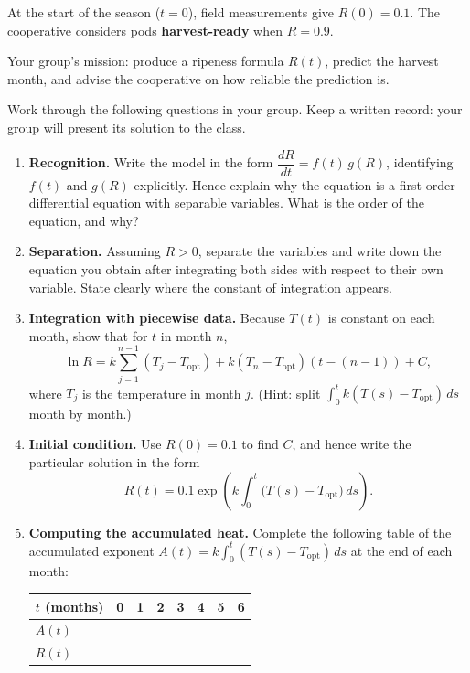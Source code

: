 \documentclass[11pt]{article}
\newcommand{\cle}[1]{{\popxbold\color{popdark}#1}}
\newcounter{popsec}
\newcounter{popsub}
\newcommand{\courssub}[1]{%
  \stepcounter{popsub}%
  \par\vspace{9pt}\noindent{\popxbold\fontsize{11.5}{13}\selectfont\color{popink}{\color{poporange}\thepopsec.\thepopsub}\hspace{6pt}#1}\par\nopagebreak\vspace{4pt}
}
\begin{document}
At the start of the season ($t=0$), field measurements give $R(0)=0.1$. The cooperative considers pods \textbf{harvest-ready} when $R=0.9$.

Your group's mission: produce a ripeness formula $R(t)$, predict the harvest month, and advise the cooperative on how reliable the prediction is.

\courssub{Tasks}

Work through the following questions in your group. Keep a written record: your group will present its solution to the class.

\begin{enumerate}
\item \textbf{Recognition.} Write the model in the form $\dfrac{dR}{dt}=f(t)\,g(R)$, identifying $f(t)$ and $g(R)$ explicitly. Hence explain why the equation is a first order differential equation with \cle{separable variables}. What is the order of the equation, and why?

\item \textbf{Separation.} Assuming $R>0$, separate the variables and write down the equation you obtain after integrating both sides with respect to their own variable. State clearly where the constant of integration appears.

\item \textbf{Integration with piecewise data.} Because $T(t)$ is constant on each month, show that for $t$ in month $n$,
\[
\ln R = k\sum_{j=1}^{n-1}(T_j-T_{\mathrm{opt}}) + k(T_n-T_{\mathrm{opt}})(t-(n-1)) + C,
\]
where $T_j$ is the temperature in month $j$. (Hint: split $\int_0^t k(T(s)-T_{\mathrm{opt}})\,ds$ month by month.)

\item \textbf{Initial condition.} Use $R(0)=0.1$ to find $C$, and hence write the particular solution in the form
\[
R(t)=0.1\exp\!\left(k\int_0^t \bigl(T(s)-T_{\mathrm{opt}}\bigr)\,ds\right).
\]

\item \textbf{Computing the accumulated heat.} Complete the following table of the accumulated exponent $A(t)=k\displaystyle\int_0^t (T(s)-T_{\mathrm{opt}})\,ds$ at the end of each month:

\begin{center}
\begin{tabular}{|l|c|c|c|c|c|c|c|}
\hline
\rowcolor{popblueL} $t$ (months) & 0 & 1 & 2 & 3 & 4 & 5 & 6 \\
\hline $A(t)$ & & & & & & & \\
\hline $R(t)$ & & & & & & & \\
\hline
\end{tabular}
\end{center}


\end{enumerate}
\end{document}
